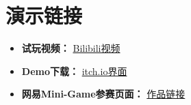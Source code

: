 \section{演示链接}
\begin{itemize}
    \item \textbf{试玩视频：}  \href{https://www.bilibili.com/video/BV1iY411q7mY/?vd_source=ead0ac501dfae814e19fd7d9f376d92d}{Bilibili视频}
    \item \textbf{Demo下载：}  \href{https://scyq.itch.io/creditors}{itch.io界面} 
    \item \textbf{网易Mini-Game参赛页面：} \href{https://game.academy.163.com/event/mg-2022?page=works&id=2838}{作品链接}
\end{itemize}
